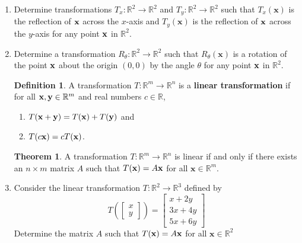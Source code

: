 \documentclass[12pt]{amsart}
\newcommand{\R}{\mathbb{R}}
\theoremstyle{definition}
\newtheorem*{definition}{Definition}
\newtheorem{theorem}{Theorem}
\begin{document}
\begin{enumerate}[itemsep=2.5em,leftmargin=0pt]

\item Determine transformations $T_x:\R^2\to\R^2$ and $T_y:\R^2\to\R^2$ such that $T_x(\mathbf{x})$ is the reflection of ${\bf x}$ across the $x$-axis and $T_y(\mathbf{x})$ is the reflection of ${\bf x}$ across the $y$-axis for any point ${\bf x}$ in $\R^2$.


\item Determine a transformation $R_\theta:\R^2\to\R^2$ such that $R_\theta(\mathbf{x})$ is a rotation of the point ${\bf x}$ about the origin $(0,0)$ by the angle $\theta$ for any point ${\bf x}$ in $\R^2$.


\begin{definition}
    A transformation $T:\R^m\to\R^n$ is a \textbf{linear transformation} if for all ${\bf x},{\bf y}\in\R^m$ and real numbers $c\in\R$,
    \begin{enumerate}[label=\arabic*.,itemsep=.25em]
        \item $\displaystyle T({\bf x} + {\bf y}) = T({\bf x}) + T({\bf y})$ and
        \item $\displaystyle T(c{\bf x})=cT({\bf x})$.
    \end{enumerate}
\end{definition}

\begin{theorem}
    A transformation $T:\R^m\to\R^n$ is linear if and only if there exists an $n\times m$ matrix $A$ such that $T({\bf x}) = A\bf{x}$ for all $\mathbf{x}\in\R^m$.
\end{theorem}


\item Consider the linear transformation $T:\R^2\to\R^3$ defined by
\[
    T\left( \left[\begin{array}{c} x \\ y \end{array}\right] \right)
    =
    \left[\begin{array}{c} x + 2y \\ 3x + 4y \\ 5x + 6y \end{array}\right]
\]
Determine the matrix $A$ such that $T({\bf x}) = A\bf{x}$ for all $\mathbf{x}\in\R^2$

\end{enumerate}
\end{document}
